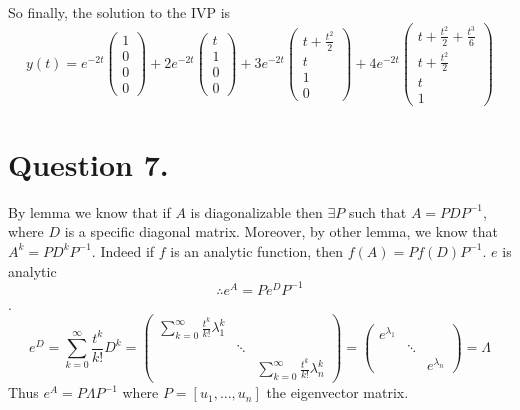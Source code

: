 \documentclass[
	12pt,
	]{article}
\theoremstyle{definition}
\theoremstyle{definition}
\theoremstyle{definition}
\theoremstyle{definition}
\theoremstyle{definition}
\theoremstyle{example}
\theoremstyle{note}
\theoremstyle{remark}
\theoremstyle{example}
\begin{document}
 			 So finally, the solution to the IVP is
 			 $$ y(t) = e^{-2t}
 			 \begin{pmatrix}
 			 	1 \\
 			 	0 \\
 			 	0\\ 
 			 	0
 			 \end{pmatrix}
 			 +2 e^{-2t}
 			 \begin{pmatrix}
 			 	t \\
 			 	1\\
 			 	0\\
 			 	0
 			 \end{pmatrix} 
 			 + 3e^{-2t}
 			 \begin{pmatrix}
 			 	t+ \frac{t^{2}}{2} \\
 			 	t \\
 			 	1 \\
 			 	0
 			 \end{pmatrix}
 			  + 4 e^{-2t}
 			  \begin{pmatrix}
 			  	t+\frac{t^{2}}{2} + \frac{t^{3}}{6} \\
 			  	t+ \frac{t^{2}}{2} \\
 			  	t \\
 			  	1
 			  \end{pmatrix}$$
 			 \section*{Question 7.}
 			 	By lemma we know that if $A$ is diagonalizable then $\exists P $ such that $A = P D P^{-1}$, where $D$ is a specific diagonal matrix. Moreover, by other lemma, we know that $A^{k} = P D^{k} P^{-1}$. Indeed if $f$ is an analytic function, then $f(A) = P f(D) P^{-1}$. $e$ is analytic 
 			 	$$ \therefore e^{A} = P e^{D} P^{-1}$$.
 			 	\begin{equation*}
 			 		e^{D} = \sum_{k=0}^{\infty} \frac{t^{k}}{k!}D^{k} = 
 			 		\begin{pmatrix}
 			 			\sum_{k=0}^{\infty}\frac{t^{k}}{k!}\lambda_{1}^{k} & & \\
 			 			& \ddots & \\
 			 			& & \sum_{k=0}^{\infty}\frac{t^{k}}{k!} \lambda_{n}^{k}
 			 		\end{pmatrix}
 			 		= 
 			 		\begin{pmatrix}
 			 			e^{\lambda_{1}} & & \\
 			 			& \ddots & \\
 			 			& & e^{\lambda_{n}}
 			 		\end{pmatrix}
 			 		= \Lambda
 			 	\end{equation*}
 			 	Thus $e^{A} = P \Lambda P^{-1}$ where $P = [u_{1} , \dots , u_{n}]$ the eigenvector matrix.
\end{document}
